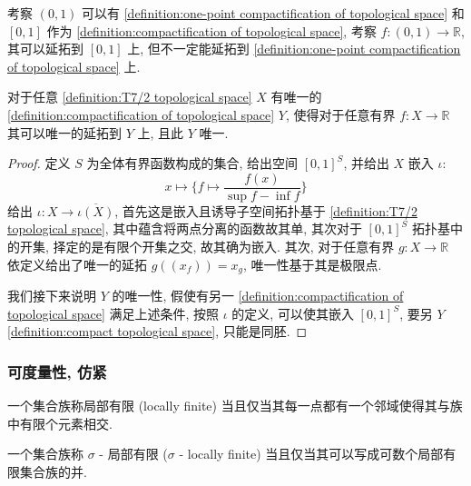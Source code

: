 \begin{example}
    考察 \((0,1)\) 可以有 \ref{definition:one-point compactification of topological space} 和 \([0,1]\) 作为 \ref{definition:compactification of topological space},
    考察 \(f : (0,1) \to \mathbb{R}\), 其可以延拓到 \([0,1]\) 上, 但不一定能延拓到 \ref{definition:one-point compactification of topological space} 上.
\end{example}

\begin{theorem}
    \label {theorem:stone-cech's compactification}
    对于任意 \ref{definition:T7/2 topological space} \(X\) 有唯一的 \ref{definition:compactification of topological space} \(Y\),
    使得对于任意有界 \(f : X \to \mathbb{R}\) 其可以唯一的延拓到 \(Y\) 上, 且此 \(Y\) 唯一.

    \begin{proof}
        定义 \(S\) 为全体有界函数构成的集合, 给出空间 \([0,1]^S\), 并给出 \(X\) 嵌入 \(\iota\):
        \[
            x \mapsto \{f \mapsto \frac{f(x)}{\sup f - \inf f}\}
        \]
        给出 \(\iota : X \to \overline{\iota (X)}\), 首先这是嵌入且诱导子空间拓扑基于 \ref{definition:T7/2 topological space},
        其中蕴含将两点分离的函数故其单, 其次对于 \([0,1]^S\) 拓扑基中的开集, 择定的是有限个开集之交, 故其确为嵌入.
        其次, 对于任意有界 \(g : X \to \mathbb{R}\) 依定义给出了唯一的延拓 \(g ((x_f)) = x_g\), 唯一性基于其是极限点.

        我们接下来说明 \(Y\) 的唯一性, 假使有另一 \ref{definition:compactification of topological space} 满足上述条件, 按照 \(\iota\) 的定义,
        可以使其嵌入 \([0,1]^S\), 要另 \(Y\) \ref{definition:compact topological space}, 只能是同胚.
    \end{proof}
\end{theorem}

\subsubsection{可度量性, 仿紧}

\begin{definition}[局部有限]
    \label {definition:locally finite family of topological space}
    一个集合族称局部有限 (locally finite) 当且仅当其每一点都有一个邻域使得其与族中有限个元素相交.
\end{definition}

\begin{definition}
    \label {definition:sigma-locally finite family of topological space}
    一个集合族称 \(\sigma\) - 局部有限 (\(\sigma\) - locally finite) 当且仅当其可以写成可数个局部有限集合族的并.
\end{definition}


